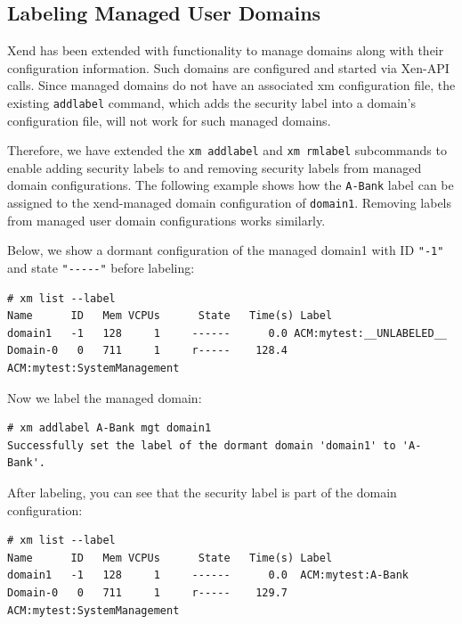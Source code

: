 \documentclass[11pt,twoside,final,openright]{report}
\begin{document}
\subsection{Labeling Managed User Domains}
\label{subsection:acmlabelmanageddomains}

Xend has been extended with functionality to manage domains along with their
configuration information. Such domains are configured and started via Xen-API
calls. Since managed domains do not have an associated xm configuration file,
the existing \verb|addlabel| command, which adds the security label into a
domain's configuration file, will not work for such managed domains.

Therefore, we have extended the \verb|xm addlabel| and \verb|xm rmlabel|
subcommands to enable adding security labels to and removing security
labels from managed domain configurations. The following example shows how
the \verb|A-Bank| label can be assigned to the xend-managed
domain configuration of \verb|domain1|. Removing labels from managed user
domain configurations works similarly.

Below, we show a dormant configuration of the managed domain1
with ID \verb|"-1"| and state \verb|"-----"| before labeling:
\begin{scriptsize}
\begin{verbatim}
# xm list --label
Name      ID   Mem VCPUs      State   Time(s) Label
domain1   -1   128     1     ------      0.0 ACM:mytest:__UNLABELED__
Domain-0   0   711     1     r-----    128.4 ACM:mytest:SystemManagement
\end{verbatim}
\end{scriptsize}

Now we label the managed domain:
\begin{scriptsize}
\begin{verbatim}
# xm addlabel A-Bank mgt domain1
Successfully set the label of the dormant domain 'domain1' to 'A-Bank'.
\end{verbatim}
\end{scriptsize}

After labeling, you can see that the security label is part of the
domain configuration:
\begin{scriptsize}
\begin{verbatim}
# xm list --label
Name      ID   Mem VCPUs      State   Time(s) Label
domain1   -1   128     1     ------      0.0  ACM:mytest:A-Bank
Domain-0   0   711     1     r-----    129.7  ACM:mytest:SystemManagement
\end{verbatim}
\end{scriptsize}
\end{document}
